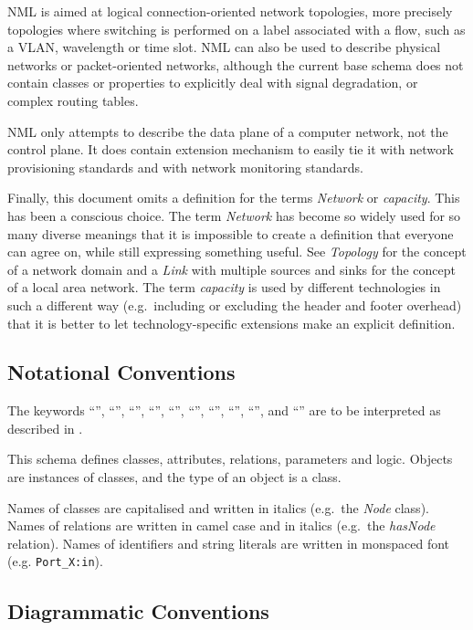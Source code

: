 NML is aimed at logical connection-oriented network topologies, more precisely topologies
where switching is performed on a label associated with a flow, such as a VLAN, wavelength or time slot. 
NML can also be used to describe physical networks or packet-oriented networks, 
although the current base schema does not contain classes or properties 
to explicitly deal with signal degradation, or complex routing tables.

NML only attempts to describe the data plane of a computer network, not the control 
plane. It does contain extension mechanism to easily tie it with network provisioning 
standards and with network monitoring standards.

Finally, this document omits a definition for the terms \emph{Network} or \emph{capacity}. 
This has been a conscious choice. The term \emph{Network} has become 
so widely used for so many diverse meanings that it is impossible to create a 
definition that everyone can agree on, while still expressing something useful.
See \emph{Topology} for the concept of a network domain and a \emph{Link} with multiple 
sources and sinks for the concept of a local area network.
The term \emph{capacity} is used by different technologies in such a different 
way (e.g.\ including or excluding the header and footer overhead) that it is better 
to let technology-specific extensions make an explicit definition.

\subsection{Notational Conventions}%
\label{sec:rfc2119}

The keywords “\MUST{}”, “\MUSTNOT{}”, “\REQUIRED{}”, “\SHALL{}”, “\SHALLNOT{}”, 
“\SHOULD{}”, “\SHOULDNOT{}”, “\RECOMMENDED{}”, “\MAY{}”,  and “\OPTIONAL{}” are 
to be interpreted as described in \cite{rfc2119}.

This schema defines classes, attributes, relations, parameters and logic.
Objects are instances of classes, and the type of an object is a class.

Names of classes are capitalised and written in italics (e.g.\ the \emph{Node} class).
Names of relations are written in camel case and in italics (e.g.\ the \emph{hasNode} relation).
Names of identifiers and string literals are written in monspaced font (e.g. \texttt{Port\_X:in}).

\subsection{Diagrammatic Conventions}%
\label{sec:diagram_notations}

